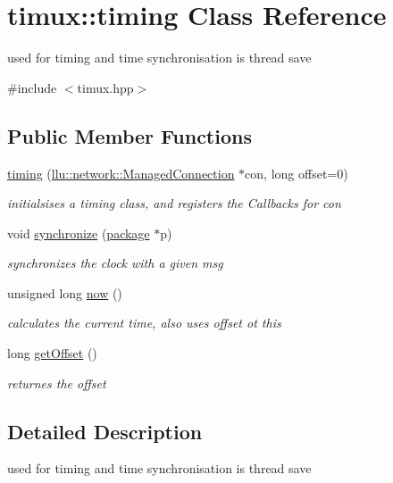 \hypertarget{classtimux_1_1timing}{\section{timux\+:\+:timing Class Reference}
\label{classtimux_1_1timing}
}


used for timing and time synchronisation is thread save  




{\ttfamily \#include $<$timux.\+hpp$>$}

\subsection*{Public Member Functions}
\begin{DoxyCompactItemize}
\item 
\hyperlink{classtimux_1_1timing_ae0da26b066603dea4f7abd847b6e583b}{timing} (\hyperlink{classllu_1_1network_1_1_managed_connection}{llu\+::network\+::\+Managed\+Connection} $\ast$con, long offset=0)
\begin{DoxyCompactList}\small\item\em initialsises a timing class, and registers the Callbacks for con \end{DoxyCompactList}\item 
void \hyperlink{classtimux_1_1timing_a668098b529ca02907b0985fd7ac67b91}{synchronize} (\hyperlink{structtimux_1_1package}{package} $\ast$p)
\begin{DoxyCompactList}\small\item\em synchronizes the clock with a given msg \end{DoxyCompactList}\item 
unsigned long \hyperlink{classtimux_1_1timing_a54814668e0ec81df6e8727959a5d61a8}{now} ()
\begin{DoxyCompactList}\small\item\em calculates the current time, also uses offset ot this \end{DoxyCompactList}\item 
long \hyperlink{classtimux_1_1timing_aadef25c2cf73f07e79ffa7ec0c7ae983}{get\+Offset} ()
\begin{DoxyCompactList}\small\item\em returnes the offset \end{DoxyCompactList}\end{DoxyCompactItemize}


\subsection{Detailed Description}
used for timing and time synchronisation is thread save 

